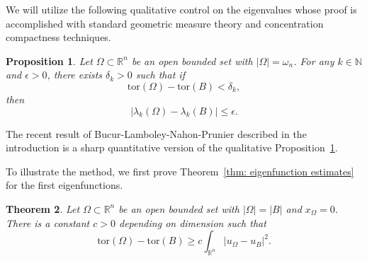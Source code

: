 \documentclass[10pt, reqno]{amsart}
\numberwithin{equation}{section}
\newtheorem{theorem}{Theorem}[section]
\newtheorem{proposition}[theorem]{Proposition}
\def\R{{\mathbb R}}
\def\W{\Omega}
\def\om{\omega}
\def\tor{\mathrm{tor}}
\begin{document}
We will utilize the following qualitative control on the eigenvalues whose proof is accomplished with standard geometric measure theory and concentration compactness techniques. 
\begin{proposition} \label{p:standard}
 Let $\W\subset\R^n$ be an open bounded set with $|\W|=\om_n$. For any $k \in \mathbb{N}$ and $\epsilon >0$, there exists $\delta_k >0$ such that if 
 \[
 \tor(\W)-\tor(B) < \delta_k, 
 \]
 then 
 \[
  |\lambda_k(\W) -\lambda_k(B)| \leq \epsilon.  
 \]
\end{proposition}
The recent result of Bucur-Lamboley-Nahon-Prunier described in the introduction is a sharp quantitative version of the qualitative Proposition~\ref{p:standard}.

To illustrate the method, we first prove Theorem~\ref{thm: eigenfunction estimates} for the first eigenfunctions. 
\begin{theorem} \label{t:first}
 Let $\W\subset \mathbb{R}^n$ be an open bounded set with $|\W|=|B|$ and $x_\W = 0$. There is a constant $c>0$ depending on dimension such that 
 \[
 \tor(\W)-\tor(B) \geq c \int_{\mathbb{R}^n} |u_{\W}-u_{B}|^2. 
 \]
\end{theorem}
\end{document}
